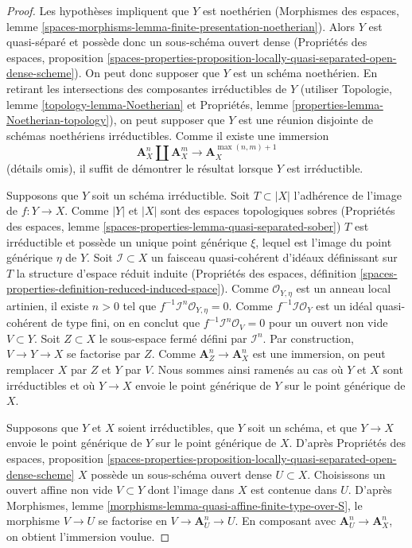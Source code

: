 \begin{proof}
Les hypothèses impliquent que $Y$ est noethérien
(Morphismes des espaces, lemme
\ref{spaces-morphisms-lemma-finite-presentation-noetherian}).
Alors $Y$ est quasi-séparé et possède donc un sous-schéma ouvert dense
(Propriétés des espaces, proposition
\ref{spaces-properties-proposition-locally-quasi-separated-open-dense-scheme}).
On peut donc supposer que $Y$ est un schéma noethérien.
En retirant les intersections des composantes irréductibles de $Y$
(utiliser Topologie, lemme \ref{topology-lemma-Noetherian} et
Propriétés, lemme \ref{properties-lemma-Noetherian-topology}),
on peut supposer que $Y$ est une réunion disjointe de schémas
noethériens irréductibles. Comme il existe une immersion
$$
\mathbf{A}^n_X \amalg \mathbf{A}^m_X
\longrightarrow
\mathbf{A}^{\max(n, m) + 1}_X
$$
(détails omis), il suffit de démontrer le résultat lorsque
$Y$ est irréductible.

\medskip\noindent
Supposons que $Y$ soit un schéma irréductible. Soit $T \subset |X|$ l'adhérence de
l'image de $f : Y \to X$. Comme $|Y|$ et $|X|$ sont des espaces topologiques sobres
(Propriétés des espaces, lemme
\ref{spaces-properties-lemma-quasi-separated-sober})
$T$ est irréductible et possède un unique point générique $\xi$, lequel est
l'image du point générique $\eta$ de $Y$.
Soit $\mathcal{I} \subset X$ un faisceau quasi-cohérent d'idéaux
définissant sur $T$ la structure d'espace réduit induite
(Propriétés des espaces, définition
\ref{spaces-properties-definition-reduced-induced-space}).
Comme $\mathcal{O}_{Y, \eta}$ est un anneau local artinien, il existe
$n > 0$ tel que $f^{-1}\mathcal{I}^n \mathcal{O}_{Y, \eta} = 0$.
Comme $f^{-1}\mathcal{I}\mathcal{O}_Y$ est un idéal quasi-cohérent de type fini,
on en conclut que $f^{-1}\mathcal{I}^n\mathcal{O}_V = 0$ pour
un ouvert non vide $V \subset Y$. Soit $Z \subset X$ le sous-espace fermé
défini par $\mathcal{I}^n$. Par construction, $V \to Y \to X$ se factorise par
$Z$. Comme $\mathbf{A}^n_Z \to \mathbf{A}^n_X$ est une immersion,
on peut remplacer $X$ par $Z$ et $Y$ par $V$.
Nous sommes ainsi ramenés au cas où $Y$ et $X$ sont irréductibles et où
$Y \to X$ envoie le point générique de $Y$ sur le point générique de $X$.

\medskip\noindent
Supposons que $Y$ et $X$ soient irréductibles, que $Y$ soit un schéma,
et que $Y \to X$ envoie le point générique de
$Y$ sur le point générique de $X$. D'après Propriétés des espaces, proposition
\ref{spaces-properties-proposition-locally-quasi-separated-open-dense-scheme}
$X$ possède un sous-schéma ouvert dense $U \subset X$. Choisissons un ouvert affine
non vide $V \subset Y$ dont l'image dans $X$ est contenue dans $U$. D'après
Morphismes, lemme \ref{morphisms-lemma-quasi-affine-finite-type-over-S},
le morphisme $V \to U$ se factorise en $V \to \mathbf{A}^n_U \to U$. En composant
avec $\mathbf{A}^n_U \to \mathbf{A}^n_X$, on obtient l'immersion voulue.
\end{proof}








